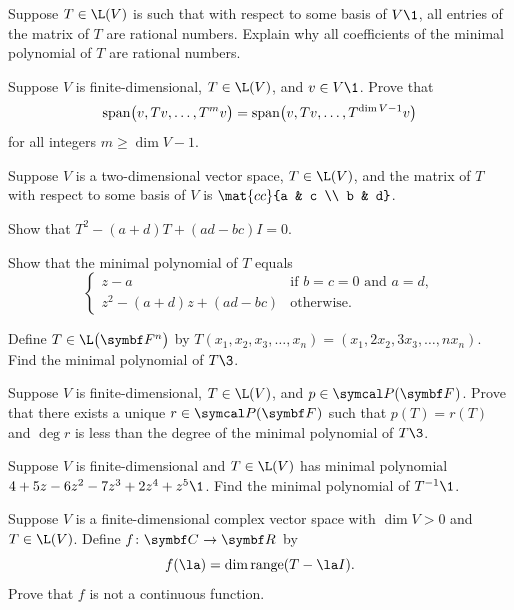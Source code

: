 \begin{exercises}
\exercise
Suppose $T \in \L(V)$ is such that with respect to some basis of $V\1$, all entries of the matrix of $T$ are rational numbers. Explain why all coefficients of the minimal polynomial of $T$ are rational numbers.


\exercise
Suppose $V$ is finite-dimensional, $T \in \L(V)$, and $v \in V\1$. Prove that
\[
\Span\paren[\big]{ v, Tv, \ldots, T^m v} = \Span\paren[\big]{v, Tv, \ldots, T^{\dim V - 1}v}
\]
for all integers $m \ge \dim V - 1$.


\exercise
Suppose $V$ is a two-dimensional vector space, $T \in \L(V)$, and the matrix of $T$ with respect to some basis of $V$ is
$
\mat{cc}{a & c \\ b & d}$.\label{5minpoly}
\begin{subtheorem}
\item
Show that $T^2 - (a+d)T + (ad - bc)I = 0$.
\item
Show that the minimal polynomial of $T$ equals
\[
\begin{cases}
z-a &\text{if } b = c = 0 \text{ and } a = d, \\
z^2 - (a+d)z + (ad-bc) &\text{otherwise}.
\end{cases}
\]
\end{subtheorem}
\exercisesubtheoremend


\exercise
Define $T \in \L\paren[\big]{\F{n}}$ by
$
T(x_1, x_2, x_3, \dots, x_n) = (x_1, 2x_2, 3x_3, \dots, n x_n)$.
Find the minimal polynomial of $T\3$.


\exercise
Suppose $V$ is finite-dimensional, $T \in \L(V)$, and $p \in \P(\F{})$. Prove that there exists a unique $r \in \P(\F{})$ such that $p(T) = r(T)$ and $\deg r$ is less than the degree of the minimal polynomial of $T\3$.


\exercise
Suppose $V$ is finite-dimensional and $T \in \L(V)$ has minimal polynomial $4 + 5z - 6z^2 - 7z^3 + 2 z^4 + z^5\1$. Find the minimal polynomial of $T^{-1}\1$.


\exercise
Suppose $V$ is a finite-dimensional complex vector space with $\dim V > 0$ and $T \in \L(V)$. Define $f \colon \C{} \to \R{}$ by
\[
f(\la) = \dim \ran (T - \la I).
\]
Prove that $f$ is not a continuous function.



\end{exercises}
